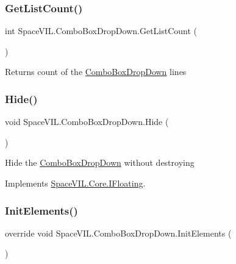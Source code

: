 \subsubsection{\texorpdfstring{Get\+List\+Count()}{GetListCount()}}
{\footnotesize\ttfamily int Space\+V\+I\+L.\+Combo\+Box\+Drop\+Down.\+Get\+List\+Count (\begin{DoxyParamCaption}{ }\end{DoxyParamCaption})}



Returns count of the \mbox{\hyperlink{class_space_v_i_l_1_1_combo_box_drop_down}{Combo\+Box\+Drop\+Down}} lines 

\mbox{\label{class_space_v_i_l_1_1_combo_box_drop_down_accb3813befaac8d9d0de181c37cf18ac}} 
\subsubsection{\texorpdfstring{Hide()}{Hide()}}
{\footnotesize\ttfamily void Space\+V\+I\+L.\+Combo\+Box\+Drop\+Down.\+Hide (\begin{DoxyParamCaption}{ }\end{DoxyParamCaption})}



Hide the \mbox{\hyperlink{class_space_v_i_l_1_1_combo_box_drop_down}{Combo\+Box\+Drop\+Down}} without destroying 



Implements \mbox{\hyperlink{interface_space_v_i_l_1_1_core_1_1_i_floating}{Space\+V\+I\+L.\+Core.\+I\+Floating}}.

\mbox{\label{class_space_v_i_l_1_1_combo_box_drop_down_aa38b0ff2634defca3efb3a25e0a599cf}} 
\subsubsection{\texorpdfstring{Init\+Elements()}{InitElements()}}
{\footnotesize\ttfamily override void Space\+V\+I\+L.\+Combo\+Box\+Drop\+Down.\+Init\+Elements (\begin{DoxyParamCaption}{ }\end{DoxyParamCaption})\hspace{0.3cm}{\ttfamily [virtual]}}



